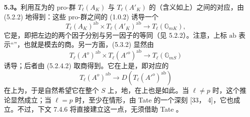 \textbf{5.3。}利用互为的 pro-群 $T_\ell(A_K)$ 与 $T_\ell(A'_K)$ 的（含义如上）之间的对应，由 (5.2.2) 地得到：这些 pro-群之间的 (1.0.2) 诱导一个
\[
T_\ell(A_K)^{\mathrm{ab}}\times T_\ell(A'_K)^{\mathrm{ab}}\longrightarrow T_\ell(\mathbb G_{mK}),\tag{5.3.2}
\]
它是，即把左边的两个因子分别与另一因子的等同（见 5.2.2）。注意，上标 $\mathrm{ab}$ 表示“”，也就是模去的商。另一方面，(5.3.2) 显然由
\[
T_\ell(A^o)^{\mathrm{ab}}\times T_\ell(A'^o)^{\mathrm{ab}}\longrightarrow T_\ell(\mathbb G_{mS})\tag{5.3.3}
\]
诱导；后者由 (5.2.4.2) 取商得到。它在上是，即对应的
\[
T_\ell(A^o)^{\mathrm{ab}}\longrightarrow D(T_\ell(A'^o)^{\mathrm{ab}})\tag{5.3.4}
\]
在上为，于是自然希望它在整个 $S$ 上，地，在上也是如此。当 $\ell\ne p$ 时，这个推论显然成立；当 $\ell=p$ 时，至少在情形，由 Tate 的一个深刻 [33， 4]，它也成立。不过，下文 7.4.6 将直接建立这一点，无须借助 Tate 。

